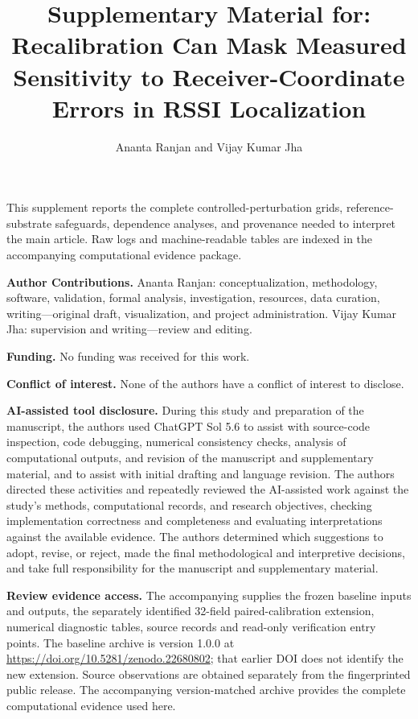 \documentclass[journal,onecolumn,10pt]{IEEEtran}
\begin{document}
\title{Supplementary Material for: Recalibration Can Mask Measured Sensitivity to Receiver-Coordinate Errors in RSSI Localization}
\author{Ananta Ranjan and Vijay Kumar Jha}
\maketitle
This supplement reports the complete controlled-perturbation grids, reference-substrate safeguards, dependence analyses, and provenance needed to interpret the main article. Raw logs and machine-readable tables are indexed in the accompanying computational evidence package. 

\noindent\textbf{Author Contributions.} Ananta Ranjan: conceptualization, methodology, software, validation, formal analysis, investigation, resources, data curation, writing---original draft, visualization, and project administration. Vijay Kumar Jha: supervision and writing---review and editing.

\noindent\textbf{Funding.} No funding was received for this work.

\noindent\textbf{Conflict of interest.} None of the authors have a conflict of interest to disclose.

\noindent\textbf{AI-assisted tool disclosure.} During this study and preparation of the manuscript, the authors used ChatGPT Sol 5.6 to assist with source-code inspection, code debugging, numerical consistency checks, analysis of computational outputs, and revision of the manuscript and supplementary material, and to assist with initial drafting and language revision. The authors directed these activities and repeatedly reviewed the AI-assisted work against the study's methods, computational records, and research objectives, checking implementation correctness and completeness and evaluating interpretations against the available evidence. The authors determined which suggestions to adopt, revise, or reject, made the final methodological and interpretive decisions, and take full responsibility for the manuscript and supplementary material.

\noindent\textbf{Review evidence access.} The accompanying  supplies the frozen baseline inputs and outputs, the separately identified 32-field paired-calibration extension, numerical diagnostic tables, source records and read-only verification entry points. The baseline archive is version 1.0.0 at \url{https://doi.org/10.5281/zenodo.22680802}; that earlier DOI does not identify the new extension. Source observations are obtained separately from the fingerprinted public release. The accompanying version-matched archive provides the complete computational evidence used here.
\end{document}
